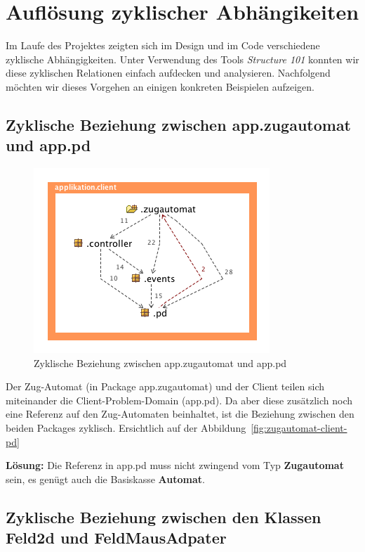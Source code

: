 \documentclass[12pt,halfparskip]{scrartcl}
\begin{document}

\section{Auflösung zyklischer Abhängikeiten}
Im Laufe des Projektes zeigten sich im Design und im Code verschiedene zyklische Abhängigkeiten. Unter Verwendung des Tools \emph{Structure 101} konnten wir diese zyklischen Relationen einfach aufdecken und analysieren. Nachfolgend möchten wir dieses Vorgehen an einigen konkreten Beispielen aufzeigen.

\subsection{Zyklische Beziehung zwischen app.zugautomat und app.pd}

\begin{figure}[h]
	\centering
	\includegraphics[width=0.5 \textwidth]{../design/probleme/zugautomat-client-pd}
	\caption{Zyklische Beziehung zwischen app.zugautomat und app.pd}
	\label{fig:zugautomat-client-pd}
\end{figure}

Der Zug-Automat (in Package app.zugautomat) und der Client teilen sich miteinander die Client-Problem-Domain (app.pd). Da aber diese zusätzlich noch eine Referenz auf den Zug-Automaten beinhaltet, ist die Beziehung zwischen den beiden Packages zyklisch. Ersichtlich auf der Abbildung~\vref{fig:zugautomat-client-pd}

\textbf{Lösung:} Die Referenz in app.pd muss nicht zwingend vom Typ \textbf{Zugautomat} sein, es genügt auch die Basiskasse \textbf{Automat}.

\subsection{Zyklische Beziehung zwischen den Klassen Feld2d und FeldMausAdpater}
\end{document}
